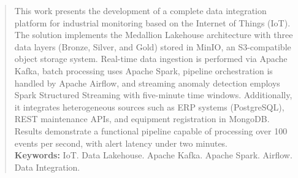 \documentclass[a4paper,12pt,Times]{article}
\newcommand{\keyword}[1]{\textsf{#1}}
\begin{document}
\newpage
{}
\begin{abstract}
\noindent
This work presents the development of a complete data integration platform for industrial
monitoring based on the Internet of Things (IoT). The solution implements the Medallion
Lakehouse architecture with three data layers (Bronze, Silver, and Gold) stored in MinIO,
an S3-compatible object storage system. Real-time data ingestion is performed via Apache Kafka,
batch processing uses Apache Spark, pipeline orchestration is handled by Apache Airflow,
and streaming anomaly detection employs Spark Structured Streaming with five-minute time
windows. Additionally, it integrates heterogeneous sources such as ERP systems (PostgreSQL),
REST maintenance APIs, and equipment registration in MongoDB. Results demonstrate a
functional pipeline capable of processing over 100 events per second, with alert
latency under two minutes.
\\\textbf{\keyword{Keywords: }} IoT. Data Lakehouse. Apache Kafka. Apache Spark. Airflow. Data Integration.
\end{abstract}

\onehalfspace
\setlength{\parindent}{1.25cm}





\newpage
\singlespace{
  
  
}
\end{document}
